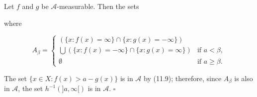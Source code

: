 Let $f$ and $g$ be $\mathcal{A}$-measurable. Then the sets

where

$$A_{\beta} = \begin{cases} \left( \{x : f(x) = \infty\} \cap \{x : g(x) = -\infty\} \right) \\ \bigcup \left( \{x : f(x) = -\infty\} \cap \{x : g(x) = \infty\} \right) & \text{if } a < \beta, \\ \emptyset & \text{if } a \geq \beta. \end{cases}$$

The set $\{x \in X : f(x) > a - g(x)\}$ is in $\mathcal{A}$ by (11.9); therefore, since $A_{\beta}$ is also in $\mathcal{A}$, the set $h^{-1}(]a, \infty[)$ is in $\mathcal{A}$. $\square$
